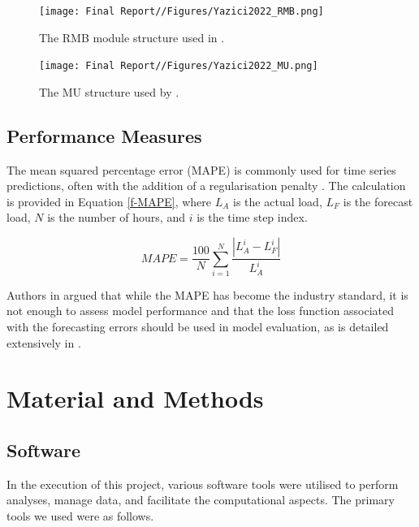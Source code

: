 \documentclass[mstat,12pt]{unswthesis}
\begin{document}
\begin{figure}[H]
    \centering
    \texttt{[image: Final Report//Figures/Yazici2022\_RMB.png]}
    \caption{The RMB module structure used in \cite{Yazici2022}.}
    \label{RMB}
\end{figure}

\begin{figure}[H]
    \centering
    \texttt{[image: Final Report//Figures/Yazici2022\_MU.png]}
    \caption{The MU structure used by \cite{Yazici2022}.}
    \label{MU}
\end{figure}

\section{Performance Measures}
The mean squared percentage error (MAPE) is commonly used for time series predictions, often with the addition of a regularisation penalty \cite{Gasparin2021}. The calculation is provided in Equation \ref{f-MAPE}, where $L_A$ is the actual load, $L_F$ is the forecast load, $N$ is the number of hours, and $i$ is the time step index.

\begin{equation}\label{f-MAPE}
    MAPE = \frac{100}{N} \sum^{N}_{i=1} {\frac{\left|L_A^i - L_F^i\right|}{L_A^i}}
\end{equation}

Authors in \cite{Hippert2001} argued that while the MAPE has become the industry standard, it is not enough to assess model performance and that the loss function associated with the forecasting errors should be used in model evaluation, as is detailed extensively in \cite{Smith2018}.



\bigskip

\hypertarget{material-and-methods}{%
\chapter{Material and Methods}\label{material-and-methods}}

\hypertarget{software}{%
\section{Software}\label{software}}
In the execution of this project, various software tools were utilised to perform analyses, manage data, and facilitate the computational aspects. The primary tools we used were as follows.
\end{document}
